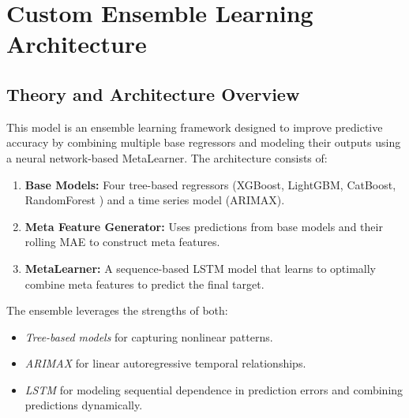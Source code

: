 

\section{Custom Ensemble Learning Architecture}

\subsection{Theory and Architecture Overview}

This model is an ensemble learning framework designed to improve predictive accuracy by combining multiple base regressors and modeling their outputs using a neural network-based MetaLearner. The architecture consists of:

\begin{enumerate}
    \item \textbf{Base Models:} Four tree-based regressors (XGBoost, LightGBM, CatBoost, RandomForest \cite{breiman2001random}) and a time series model (ARIMAX).
    \item \textbf{Meta Feature Generator:} Uses predictions from base models and their rolling MAE to construct meta features.
    \item \textbf{MetaLearner:} A sequence-based LSTM model that learns to optimally combine meta features to predict the final target.
\end{enumerate}

The ensemble leverages the strengths of both:
\begin{itemize}
    \item \textit{Tree-based models} for capturing nonlinear patterns.
    \item \textit{ARIMAX} for linear autoregressive temporal relationships.
    \item \textit{LSTM} for modeling sequential dependence in prediction errors and combining predictions dynamically.
\end{itemize}


